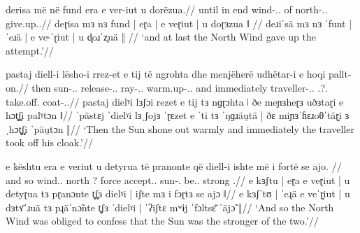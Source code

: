 \documentclass[a4paper,12pt]{article}
\newcommand{\gipa}{ɡ}
\begin{document}
\ex
\begingl
\gla derisa më në fund {} era {} e ver-iut {} {u dorëzua}.//
\glgloss until {\Cmpr} in end {} wind-{\Nom.\Sg.\Def} {} of north-{\Gen.\Sg.\Def} {} give.up.{\Aor.\Tsg}//
\glpm deɽisa mɜ nɜ fund | eɽa | e veɽiut | {u doɽɜzua} ǁ //
\glph  deɹiˈsä mɜ nɜ ˈfunt | ˈeɹä | e ve˞ˈɽiut | {u d̥oɹˈz̥uä} ‖ //
\glft  `and at last the North Wind gave up the attempt.'//
\endgl
\xe

\ex
\begingl
\gla pastaj diell-i lësho-i rrez-et e tij {të ngrohta} {} dhe menjëherë udhëtar-i e hoqi pallt-on.//
\glgloss then sun-{\Nom.\Sg.\Def} release-{\Pst.\Tsg.\Def} ray-{\Nom.\Pl.\Def} {\Inf} {\Tsg} warm.up-{\Acc.\Pl.\Def} {} and immediately traveller-{\Nom.\Sg.\Def} {\Tsg.?.\Acc} take.off.{\Pst} coat-{\Acc.\Sg.\Def}//
\glpm  pastaj dielˠi lɜʃɔi rezet e tij {tɜ n\gipa{}ɽɔhta} ǀ ðe meɲɜheɽɜ uðɜtaɽi e hɔt̻ʃ̻i palˠtɔn ǁ//
\glph  ˈpästɛj ˈdielˠi lɜˌʃojɜ ˈɽɛzet e ˈti {tɜ ˈŋ\gipa{}ɹäu̯tä} | ðɛ miɲɜˈɦɛɹoθˈtäɽ̞i {} ɜ ˌhɔt̻ʃ̻i ˈpäu̯tɔn ‖//
\glft  `Then the Sun shone out warmly and immediately the traveller took off his cloak.'//
\endgl
\xe

\ex
\begingl
\gla e kështu {} era e veriut {} u detyrua të pranonte që diell-i {} ishte më {i fortë} se ajo. {}//
\glgloss and so {} wind.\Det{}.\Sg{} {\Gen} north {} ? force {\Subj} accept.{\Pst}.{\Tsg} {\Comp} sun-{\Det.\Sg} {} be.{\Pst.\Tsg} {\Cmpr} {strong \Comp{}} {\Tsg.\F}//
\glpm e kɜʃtu | eɽa e veɽiut | u detyɽua tɜ pɽanɔnte t̻ʃ̻ɜ dielˠi | iʃte mɜ {i fɔɽtɜ} se ajɔ ǁ//
\glph e kɜʃˈtʊ | ˈeɻä e veˈɽ̞iut | u dɜtʏ̈ˈɹuä tɜ pɻäˈnɔ̃nte t̻ʃɜ ˈdielˠi | ˈʔiʃtɛ mʷɨj ˈfɔltsɛ̆ {} ˈäjɔ̃ ‖//
\glft  `And so the North Wind was obliged to confess that the Sun was the stronger of the two.'//
\endgl
\xe

\printglosses
\end{document}
